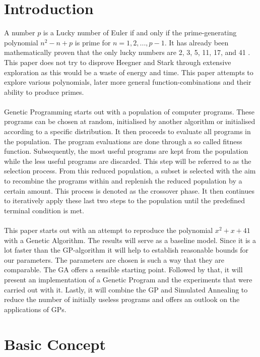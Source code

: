 \documentclass[11pt,a4paper]{article}
\begin{document}
\section*{Introduction}
A number $p$ is a Lucky number of Euler if and only if the prime-generating polynomial $n^2-n+p$ is prime for $n=1, 2, ..., p-1$. It has already been mathematically proven that the only lucky numbers are 2, 3, 5, 11, 17, and 41 \citep{Euler}. This paper does not try to disprove Heegner and Stark \citep{Euler} through extensive exploration as this would be a waste of energy and time. This paper attempts to explore various polynomials, later more general function-combinations and their ability to produce primes.
\\ \\
Genetic Programming starts out with a population of computer programs. These programs can be chosen at random, initialised by another algorithm or initialised according to a specific distribution. It then proceeds to evaluate all programs in the population. The program evaluations are done through a so called fitness function. Subsequently, the most useful programs are kept from the population while the less useful programs are discarded. This step will be referred to as the selection process. From this reduced population, a subset is selected with the aim to recombine the programs within and replenish the reduced population by a certain amount. This process is denoted as the crossover phase. It then continues to iteratively apply these last two steps to the population until the predefined terminal condition is met.
\\ \\
This paper starts out with an attempt to reproduce the polynomial $x^2+x+41$ with a Genetic Algorithm. The results will serve as a baseline model. Since it is a lot faster than the GP-algorithm it will help to establish reasonable bounds for our parameters. The parameters are chosen is such a way that they are comparable. The GA offers a sensible starting point. Followed by that, it will present an implementation of a Genetic Program and the experiments that were carried out with it. Lastly, it will combine the GP and Simulated Annealing to reduce the number of initially useless programs and offers an outlook on the applications of GPs.
\section*{Basic Concept}
\end{document}
